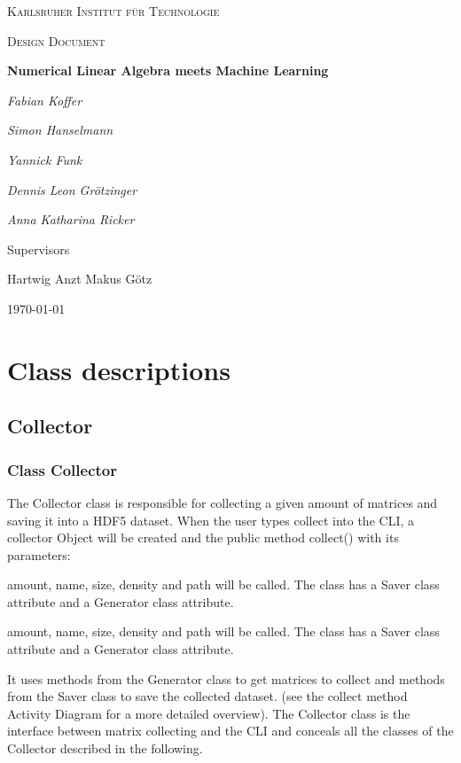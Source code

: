 \documentclass[parskip=full]{scrartcl}
\begin{document}
\begin{titlepage}
\centering
{\scshape\LARGE Karlsruher Institut für Technologie\par}
\vspace{1cm}
{\scshape\Large Design Document\par}
\vspace{1.5cm}
{\huge\bfseries Numerical Linear Algebra meets Machine Learning \par}
\vspace {2cm}

{\Large\itshape Fabian Koffer\par}
{\Large\itshape Simon Hanselmann\par}
{\Large\itshape Yannick Funk\par}
{\Large\itshape Dennis Leon Gr\"{o}tzinger\par}
{\Large\itshape Anna Katharina Ricker\par}

\vfill
Supervisors\par
Hartwig Anzt
Makus G\"{o}tz

\vfill
{\large\today\par}
\end{titlepage}

\tableofcontents
\newpage


\section{Class descriptions}

\subsection{Collector}
\subsubsection{Class Collector}
The Collector class is responsible for collecting a given amount of matrices and saving it into a HDF5 dataset.
When the user types collect into the CLI, a collector Object will be created and the public method collect() with its parameters:

amount, name, size, density and path will be called. The class has a Saver class attribute and a Generator class attribute.

amount, name, size, density and path will be called. The class has a Saver class attribute and a Generator class attribute. 

It uses methods from the Generator class to get matrices to collect and methods from the Saver class to save the collected dataset.
(see the collect method Activity Diagram for a more detailed overview).
The Collector class is the interface between matrix collecting and the CLI and conceals all the classes of the Collector described in the following.
\end{document}
